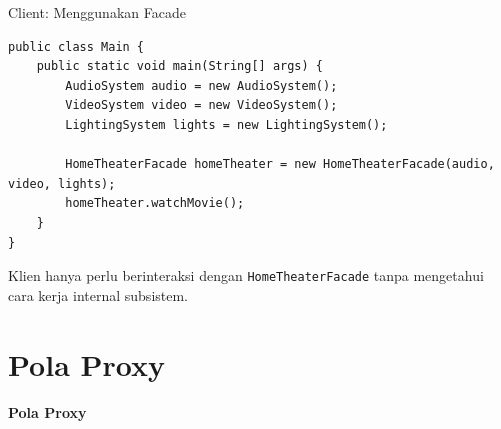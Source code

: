 \documentclass[aspectratio=169, table]{beamer}
\begin{document}
\begin{frame}[fragile]{Client: Menggunakan Facade}
\vspace{20pt}
\begin{lstlisting}[style=JavaStyle]
public class Main {
	public static void main(String[] args) {
		AudioSystem audio = new AudioSystem();
		VideoSystem video = new VideoSystem();
		LightingSystem lights = new LightingSystem();
		
		HomeTheaterFacade homeTheater = new HomeTheaterFacade(audio, video, lights);
		homeTheater.watchMovie();
	}
}
\end{lstlisting}
\small Klien hanya perlu berinteraksi dengan \texttt{HomeTheaterFacade} tanpa mengetahui cara kerja internal subsistem.
\end{frame}


\section{Pola Proxy}

\begin{frame}{\hfill}
	\centering
	\textbf{\Huge{Pola Proxy}}
\end{frame}
\end{document}
